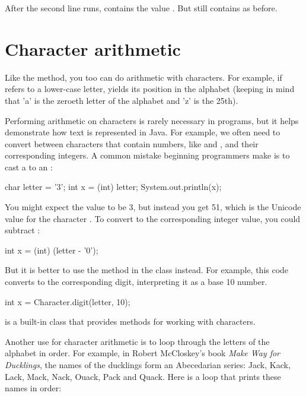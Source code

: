 
After the second line runs,  contains the value .
But  still contains  as before.


\section{Character arithmetic}

Like the  method, you too can do arithmetic with characters.
For example, if  refers to a lower-case letter,  yields its position in the alphabet (keeping in mind that 'a' is the zeroeth letter of the alphabet and 'z' is the 25th).

Performing arithmetic on characters is rarely necessary in programs, but it helps demonstrate how text is represented in Java.
For example, we often need to convert between characters that contain numbers, like  and , and their corresponding integers.
A common mistake beginning programmers make is to cast a  to an :

\begin{code}
char letter = '3';
int x = (int) letter;
System.out.println(x);
\end{code}

You might expect the value to be 3, but instead you get 51, which is the Unicode value for the character .
To convert  to the corresponding integer value, you could subtract :

\begin{code}
int x = (int) (letter - '0');
\end{code}

But it is better to use the  method in the  class instead.
For example, this code converts  to the corresponding digit, interpreting it as a base 10 number.

\begin{code}
int x = Character.digit(letter, 10);
\end{code}

 is a built-in class that provides methods for working with characters.

Another use for character arithmetic is to loop through the letters of the alphabet in order.
For example, in Robert McCloskey's book {\em Make Way for Ducklings}, the names of the ducklings form an Abecedarian series: Jack, Kack, Lack, Mack, Nack, Ouack, Pack and Quack.
Here is a loop that prints these names in order:

